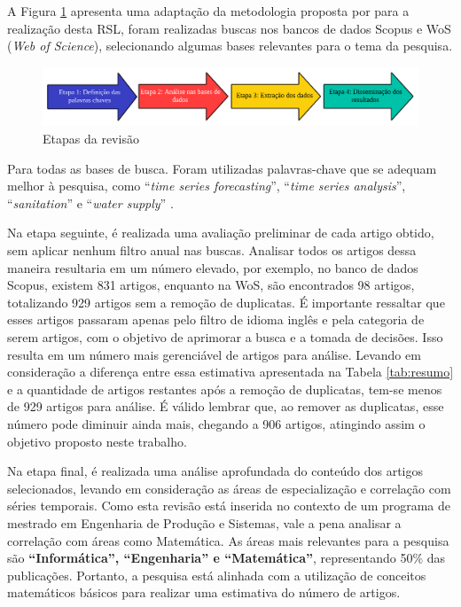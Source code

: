 A Figura \ref{fig:rsl} apresenta uma adaptação da metodologia proposta por  para a realização desta RSL, foram realizadas buscas nos bancos de dados Scopus e WoS (\textit{Web of Science}), selecionando algumas bases relevantes para o tema da pesquisa.

\begin{figure}[!htb]
	\centering
	\caption{Etapas da revisão}
	\label{fig:rsl}
	\includegraphics[width=\linewidth]{Revisao/Figuras/RSL}
	
\end{figure}

Para todas as bases de busca. Foram utilizadas palavras-chave que se adequam melhor à pesquisa, como ``\textit{time series forecasting}'', ``\textit{time series analysis}'', ``\textit{sanitation}'' e ``\textit{water supply}'' .


Na etapa seguinte, é realizada uma avaliação preliminar de cada artigo obtido, sem aplicar nenhum filtro anual nas buscas. Analisar todos os artigos dessa maneira resultaria em um número elevado, por exemplo, no banco de dados Scopus, existem 831 artigos, enquanto na WoS, são encontrados 98 artigos, totalizando 929 artigos sem a remoção de duplicatas. É importante ressaltar que esses artigos passaram apenas pelo filtro de idioma inglês e pela categoria de serem artigos, com o objetivo de aprimorar a busca e a tomada de decisões. Isso resulta em um número mais gerenciável de artigos para análise. Levando em consideração a diferença entre essa estimativa apresentada na Tabela \ref{tab:resumo} e a quantidade de artigos restantes após a remoção de duplicatas, tem-se menos de 929 artigos para análise. É válido lembrar que, ao remover as duplicatas, esse número pode diminuir ainda mais, chegando a 906 artigos, atingindo assim o objetivo proposto neste trabalho.

Na etapa final, é realizada uma análise aprofundada do conteúdo dos artigos selecionados, levando em consideração as áreas de especialização e correlação com séries temporais. Como esta revisão está inserida no contexto de um programa de mestrado em Engenharia de Produção e Sistemas, vale a pena analisar a correlação com áreas como Matemática. As áreas mais relevantes para a pesquisa são \textbf{``Informática'', ``Engenharia'' e ``Matemática''}, representando 50\% das publicações. Portanto, a pesquisa está alinhada com a utilização de conceitos matemáticos básicos para realizar uma estimativa do número de artigos.


